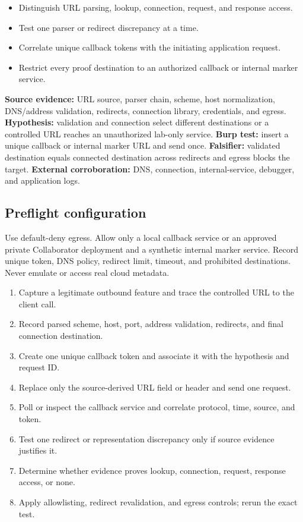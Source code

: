 \documentclass[11pt]{article}
\newcommand{\weekfield}[2]{%
  \Needspace{5\baselineskip}
  \subsection*{#1}
  #2
}
\newcommand{\externalproof}[1]{\textbf{External corroboration:} #1}
\begin{document}
\begin{objectivebox}
\begin{itemize}
  \item Distinguish URL parsing, lookup, connection, request, and response access.
  \item Test one parser or redirect discrepancy at a time.
  \item Correlate unique callback tokens with the initiating application request.
  \item Restrict every proof destination to an authorized callback or internal marker service.
\end{itemize}
\end{objectivebox}

\begin{bridgebox}
\textbf{Source evidence:} URL source, parser chain, scheme, host normalization,
DNS/address validation, redirects, connection library, credentials, and egress.
\textbf{Hypothesis:} validation and connection select different destinations or
a controlled URL reaches an unauthorized lab-only service. \textbf{Burp test:}
insert a unique callback or internal marker URL and send once. \textbf{Falsifier:}
validated destination equals connected destination across redirects and egress
blocks the target. \externalproof{DNS, connection, internal-service, debugger,
and application logs.}
\end{bridgebox}

\weekfield{Preflight configuration}{Use default-deny egress. Allow only a local
callback service or an approved private Collaborator deployment and a synthetic
internal marker service. Record unique token, DNS policy, redirect limit, timeout,
and prohibited destinations. Never emulate or access real cloud metadata.}

\begin{procedurebox}
\begin{enumerate}
  \item Capture a legitimate outbound feature and trace the controlled URL to the client call.
  \item Record parsed scheme, host, port, address validation, redirects, and final connection destination.
  \item Create one unique callback token and associate it with the hypothesis and request ID.
  \item Replace only the source-derived URL field or header and send one request.
  \item Poll or inspect the callback service and correlate protocol, time, source, and token.
  \item Test one redirect or representation discrepancy only if source evidence justifies it.
  \item Determine whether evidence proves lookup, connection, request, response access, or none.
  \item Apply allowlisting, redirect revalidation, and egress controls; rerun the exact test.
\end{enumerate}
\end{procedurebox}
\end{document}
